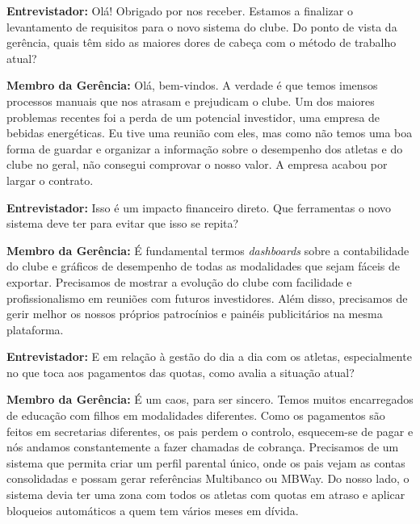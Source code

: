 
\begin{tcolorbox}[colback=white, colframe=gray!50, arc=1mm, title=\textbf{Transcrição da Entrevista à Gerência}]
\small
\textbf{Entrevistador:} Olá! Obrigado por nos receber. Estamos a finalizar o levantamento de requisitos para o novo sistema do clube. Do ponto de vista da gerência, quais têm sido as maiores dores de cabeça com o método de trabalho atual?

\textbf{Membro da Gerência:} Olá, bem-vindos. A verdade é que temos imensos processos manuais que nos atrasam e prejudicam o clube. Um dos maiores problemas recentes foi a perda de um potencial investidor, uma empresa de bebidas energéticas. Eu tive uma reunião com eles, mas como não temos uma boa forma de guardar e organizar a informação sobre o desempenho dos atletas e do clube no geral, não consegui comprovar o nosso valor. A empresa acabou por largar o contrato.

\textbf{Entrevistador:} Isso é um impacto financeiro direto. Que ferramentas o novo sistema deve ter para evitar que isso se repita?

\textbf{Membro da Gerência:} É fundamental termos \textit{dashboards} sobre a contabilidade do clube e gráficos de desempenho de todas as modalidades que sejam fáceis de exportar. Precisamos de mostrar a evolução do clube com facilidade e profissionalismo em reuniões com futuros investidores. Além disso, precisamos de gerir melhor os nossos próprios patrocínios e painéis publicitários na mesma plataforma.

\textbf{Entrevistador:} E em relação à gestão do dia a dia com os atletas, especialmente no que toca aos pagamentos das quotas, como avalia a situação atual?

\textbf{Membro da Gerência:} É um caos, para ser sincero. Temos muitos encarregados de educação com filhos em modalidades diferentes. Como os pagamentos são feitos em secretarias diferentes, os pais perdem o controlo, esquecem-se de pagar e nós andamos constantemente a fazer chamadas de cobrança. Precisamos de um sistema que permita criar um perfil parental único, onde os pais vejam as contas consolidadas e possam gerar referências Multibanco ou MBWay. Do nosso lado, o sistema devia ter uma zona com todos os atletas com quotas em atraso e aplicar bloqueios automáticos a quem tem vários meses em dívida.


\end{tcolorbox}
